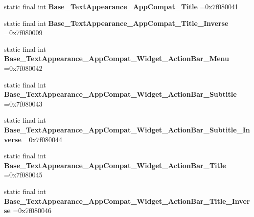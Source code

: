 \begin{DoxyCompactItemize}
\item 
\hypertarget{classcheck_1_1test_1_1_r_1_1style_a16794a9d3b49ef77a028478883b3083e}{}static final int {\bfseries Base\+\_\+\+Text\+Appearance\+\_\+\+App\+Compat\+\_\+\+Title} =0x7f080041\label{classcheck_1_1test_1_1_r_1_1style_a16794a9d3b49ef77a028478883b3083e}

\item 
\hypertarget{classcheck_1_1test_1_1_r_1_1style_a61d09d4e1ebff02bcbb8a157dff32942}{}static final int {\bfseries Base\+\_\+\+Text\+Appearance\+\_\+\+App\+Compat\+\_\+\+Title\+\_\+\+Inverse} =0x7f080009\label{classcheck_1_1test_1_1_r_1_1style_a61d09d4e1ebff02bcbb8a157dff32942}

\item 
\hypertarget{classcheck_1_1test_1_1_r_1_1style_a47ca56689b4a3c40894cff0e3ea334c9}{}static final int {\bfseries Base\+\_\+\+Text\+Appearance\+\_\+\+App\+Compat\+\_\+\+Widget\+\_\+\+Action\+Bar\+\_\+\+Menu} =0x7f080042\label{classcheck_1_1test_1_1_r_1_1style_a47ca56689b4a3c40894cff0e3ea334c9}

\item 
\hypertarget{classcheck_1_1test_1_1_r_1_1style_a951a6df09e499ec5394aa9602deac796}{}static final int {\bfseries Base\+\_\+\+Text\+Appearance\+\_\+\+App\+Compat\+\_\+\+Widget\+\_\+\+Action\+Bar\+\_\+\+Subtitle} =0x7f080043\label{classcheck_1_1test_1_1_r_1_1style_a951a6df09e499ec5394aa9602deac796}

\item 
\hypertarget{classcheck_1_1test_1_1_r_1_1style_a9027e6f82c577b17d83382d6e965f769}{}static final int {\bfseries Base\+\_\+\+Text\+Appearance\+\_\+\+App\+Compat\+\_\+\+Widget\+\_\+\+Action\+Bar\+\_\+\+Subtitle\+\_\+\+Inverse} =0x7f080044\label{classcheck_1_1test_1_1_r_1_1style_a9027e6f82c577b17d83382d6e965f769}

\item 
\hypertarget{classcheck_1_1test_1_1_r_1_1style_ac0bd71fb5b52c3de9a537c99677bc1cf}{}static final int {\bfseries Base\+\_\+\+Text\+Appearance\+\_\+\+App\+Compat\+\_\+\+Widget\+\_\+\+Action\+Bar\+\_\+\+Title} =0x7f080045\label{classcheck_1_1test_1_1_r_1_1style_ac0bd71fb5b52c3de9a537c99677bc1cf}

\item 
\hypertarget{classcheck_1_1test_1_1_r_1_1style_a7b7ca49b10f6acd4b23c2111c6968845}{}static final int {\bfseries Base\+\_\+\+Text\+Appearance\+\_\+\+App\+Compat\+\_\+\+Widget\+\_\+\+Action\+Bar\+\_\+\+Title\+\_\+\+Inverse} =0x7f080046\label{classcheck_1_1test_1_1_r_1_1style_a7b7ca49b10f6acd4b23c2111c6968845}


\end{DoxyCompactItemize}
